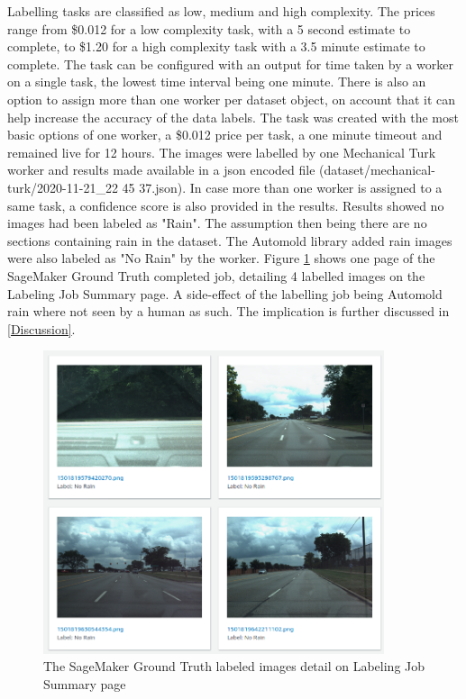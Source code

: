 Labelling tasks are classified as low, medium and high complexity. The prices range from \$0.012 for a low complexity task, with a 5 second estimate to complete, to \$1.20 for a high complexity task with a 3.5 minute estimate to complete.
The task can be configured with an output for time taken by a worker on a single task, the lowest time interval being one minute.
There is also an option to assign more than one worker per dataset object, on account that it can help increase the accuracy of the data labels.
The task was created with the most basic options of one worker, a \$0.012 price per task, a one minute timeout and remained live for 12 hours. 
The images were labelled by one Mechanical Turk worker and results made available in a json encoded file (dataset/mechanical-turk/2020-11-21\_22 45 37.json). In case more than one worker is assigned to a same task, a confidence score is also provided in the results. Results showed no images had been labeled as "Rain". The assumption then being there are no sections containing rain in the dataset. The Automold library added rain images were also labeled as "No Rain" by the worker. Figure \ref{fig:MechTurkLabeledImages} shows one page of the SageMaker Ground Truth completed job, detailing 4 labelled images on the Labeling Job Summary page. A side-effect of the labelling job being Automold rain where not seen by a human as such. The implication is further discussed in \ref{Discussion}.
\begin{figure}[h!]
\centering
\includegraphics[width=10cm]{Figures/MechTurkLabeledImages.png}
\caption{The SageMaker Ground Truth labeled images detail on Labeling Job Summary page}
\label{fig:MechTurkLabeledImages}
\end{figure}